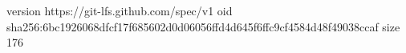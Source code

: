 version https://git-lfs.github.com/spec/v1
oid sha256:6bc1926068dfcf17f685602d0d06056ffd4d645f6ffc9cf4584d48f49038ccaf
size 176
